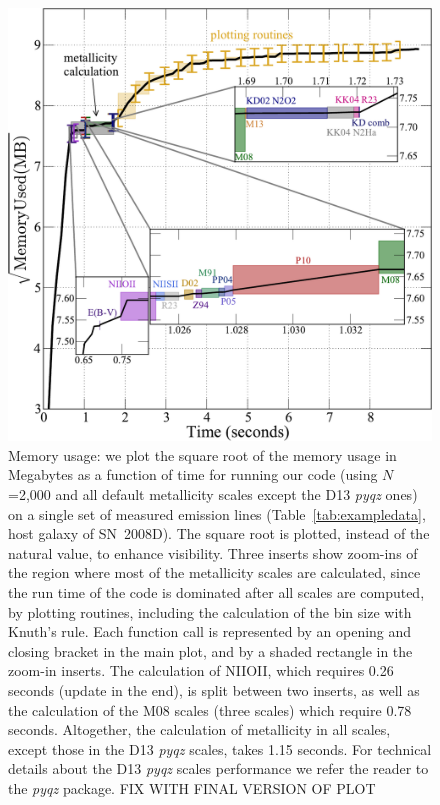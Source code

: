 \documentclass{emulateapj}
\begin{document}
\begin{figure}[ht!]
  \includegraphics[width=1.0\columnwidth]{memusage.pdf}
   \caption{Memory usage: we plot the square root of the memory usage in Megabytes as a function of time for running our code (using $N$=2,000 and all default metallicity scales except the D13 \emph{pyqz} ones) on a single set of measured emission lines (Table~\ref{tab:exampledata}, host galaxy of SN~2008D). The square root is plotted, instead of the natural value, to enhance visibility.  
Three inserts show zoom-ins of the region where most of the metallicity scales are calculated, since the run time of the code is dominated after all scales are computed, by plotting routines, including the calculation of the bin size with Knuth's rule. 
Each function call is represented by an opening and closing bracket in the main plot, and by a shaded rectangle in the zoom-in inserts.
The calculation of NIIOII, which requires 0.26 seconds (update in the end), is split between two inserts, as well as the calculation of the M08 scales (three scales) which require 0.78 seconds. Altogether, the calculation of metallicity in all scales, except those in the D13 \emph{pyqz} scales, takes 1.15 seconds. For technical details about the D13 \emph{pyqz} scales performance we refer the reader to the \emph{pyqz} package. FIX WITH FINAL VERSION OF PLOT}
 \label{fig:mem}
\end{figure}
\end{document}
